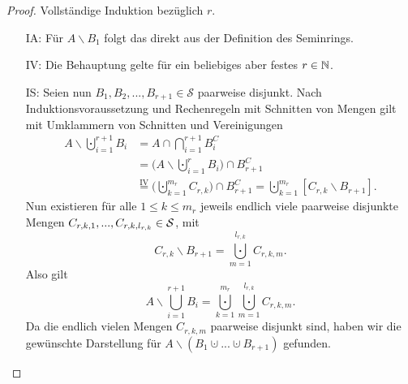 \begin{proof}
	Vollständige Induktion bezüglich $r$. \begin{itemize}
		\item [IA:] Für $A \backslash B_1$ folgt das direkt aus der Definition des Seminrings.
		\item [IV:] Die Behauptung gelte für ein beliebiges aber festes $r \in \mathbb{N}$.
		\item [IS:] Seien nun $B_1,B_2,...,B_{r+1} \in \mathcal S$ paarweise disjunkt. Nach Induktionsvoraussetzung und Rechenregeln mit Schnitten von Mengen gilt mit Umklammern von Schnitten und Vereinigungen
		\begin{align*}
		A \backslash \bigcupdot\limits_{i = 1}^{r+1} B_i &= A\cap  \bigcap_{i=1}^{r+1} B_i^C\\
		 &= \Big(A\backslash \bigcupdot_{i=1}^r B_i\Big) \cap B_{r+1}^C\\
		 & \overset{\text{IV}}{=} \Big(\bigcupdot\limits_{k = 1}^{m_r}  C_{r,k}\Big) \cap  B_{r + 1}^C
		 =\bigcupdot\limits_{k = 1}^{m_r} [C_{r,k} \backslash B_{r + 1}].
		\end{align*}
		Nun existieren für alle $1 \leq k \leq m_r$ jeweils endlich viele paarweise disjunkte Mengen $C_{r,k,1},...,C_{r,k,l_{r,k}} \in \mathcal{S}$, mit 
		\[ C_{r,k} \backslash B_{r + 1} = \bigcupdot\limits_{m = 1}^{l_{r,k}} C_{r,k,m}. \]
		Also gilt \[
		A \backslash \bigcup\limits_{i = 1}^{r+1} B_i = \bigcupdot\limits_{k = 1}^{m_r} \bigcupdot\limits_{m = 1}^{l_{r,k}} C_{r,k,m}. \]
		Da die endlich vielen Mengen $C_{r,k,m}$ paarweise disjunkt sind, haben wir die gewünschte Darstellung f\"ur $A \backslash (B_1 \cupdot ... \cupdot B_{r+1})$ gefunden.
	\end{itemize}
\end{proof}




